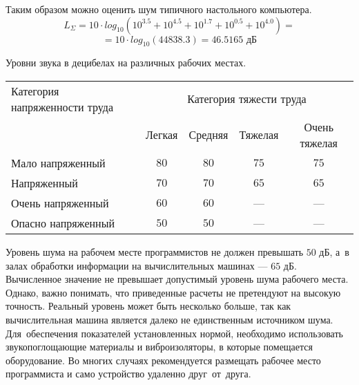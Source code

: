 \pagebreak

Таким образом можно оценить шум типичного настольного компьютера.
\[
	L_{\varSigma} = 10 \cdot log_{10} \left( 
		10^{3.5} +  10^{4.5} + 		10^{1.7} + 		10^{0.5} + 		10^{4.0}	
	 \right) =
\]\[
	 = 10 \cdot log_{10} (44838.3) = 46.5165 \text{ дБ}
\]

\begin{dtable}{Уровни звука в децибелах на различных рабочих местах.}
	\begin{tabular}{|m{5cm}|c|c|c|c|}
		\hline	Категория напряженности труда	  & \multicolumn{4}{c|}{Категория тяжести труда} \\ 
		\cline{2-5}
				&	Легкая	&	Средняя 	&	Тяжелая		&	Очень тяжелая \\
		\hline	Мало напряженный
				& 	$80$	&		$80$	&		$75$	&		$75$	\\
		\hline	Напряженный
				& 	$70$	&		$70$	&		$65$	&		$65$	\\
		\hline	Очень напряженный
				& 	$60$	&		$60$	&		---		&		---		\\
		\hline	Опасно напряженный	
				& 	$50$	&		$50$	&		---		&		---		 \\
		\hline 
	\end{tabular} 
\end{dtable}

Уровень шума на рабочем месте программистов не должен превышать $50$ дБ, 
а~в залах обработки информации на вычислительных машинах --- $65$ дБ. 
Вычисленное значение не превышает допустимый уровень шума рабочего места. 
Однако, важно понимать, что приведенные расчеты не претендуют на высокую точность.
Реальный уровень может быть несколько больше, так как вычислительная 
машина является далеко  не единственным источником шума.
Для~обеспечения показателей установленных нормой, необходимо использовать
звукопоглощающие материалы и виброизоляторы, в которые помещается
оборудование. Во многих случаях рекомендуется размещать 
рабочее место программиста и само устройство удаленно друг~от~друга.

\pagebreak

